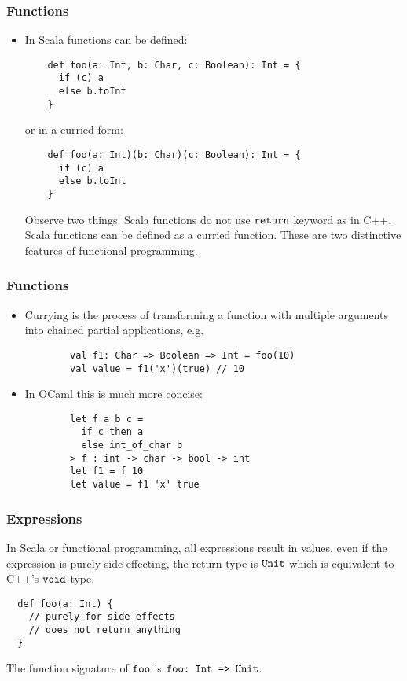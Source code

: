 \documentclass[handout]{beamer}
\begin{document}
\begin{frame}[fragile]
  \frametitle{Functions}
  \begin{itemize}
  \item In Scala functions can be defined:
    \begin{verbatim}
    def foo(a: Int, b: Char, c: Boolean): Int = {
      if (c) a
      else b.toInt
    }
    \end{verbatim}
    or in a curried form:
    \begin{verbatim}
    def foo(a: Int)(b: Char)(c: Boolean): Int = {
      if (c) a
      else b.toInt
    }
    \end{verbatim}
    Observe two things. Scala functions do not use $\verb|return|$ keyword as in C++. Scala functions can be defined as a curried function. These are two distinctive features of functional programming.
  \end{itemize}
\end{frame}

\begin{frame}[fragile]
  \frametitle{Functions}
  \begin{itemize}
      \item Currying is the process of transforming a function with multiple arguments into chained partial applications, e.g.
      \begin{verbatim}
        val f1: Char => Boolean => Int = foo(10)
        val value = f1('x')(true) // 10
      \end{verbatim}
      \item In OCaml this is much more concise:
        \begin{verbatim}
        let f a b c =
          if c then a
          else int_of_char b
        > f : int -> char -> bool -> int
        let f1 = f 10
        let value = f1 'x' true
        \end{verbatim}
  \end{itemize}
\end{frame}

\begin{frame}[fragile]
  \frametitle{Expressions}
  In Scala or functional programming, all expressions result in values, even if the expression is purely side-effecting, the return type is $\verb|Unit|$ which is equivalent to C++'s $\verb|void|$ type.
  \begin{verbatim}
  def foo(a: Int) {
    // purely for side effects
    // does not return anything
  }
  \end{verbatim}
  The function signature of $\verb|foo|$ is $\verb|foo: Int => Unit|$.
\end{frame}
\end{document}

